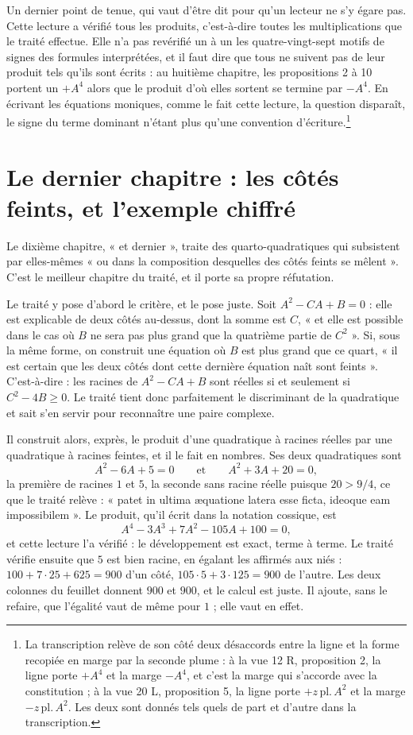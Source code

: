 \documentclass[11pt,a4paper]{article}
\begin{document}
Un dernier point de tenue, qui vaut d'être dit pour qu'un lecteur ne s'y égare
pas. Cette lecture a vérifié tous les produits, c'est-à-dire toutes les
multiplications que le traité effectue. Elle n'a pas revérifié un à un les
quatre-vingt-sept motifs de signes des formules interprétées, et il faut dire
que tous ne suivent pas de leur produit tels qu'ils sont écrits : au huitième
chapitre, les propositions 2 à 10 portent un $+A^4$ alors que le produit d'où
elles sortent se termine par $-A^4$. En écrivant les équations moniques, comme
le fait cette lecture, la question disparaît, le signe du terme dominant
n'étant plus qu'une convention d'écriture.\footnote{La transcription relève de
son côté deux désaccords entre la ligne et la forme recopiée en marge par la
seconde plume : à la vue 12 R, proposition 2, la ligne porte $+A^4$ et la marge
$-A^4$, et c'est la marge qui s'accorde avec la constitution ; à la vue 20 L,
proposition 5, la ligne porte $+z\,\mathrm{pl.}\,A^2$ et la marge
$-z\,\mathrm{pl.}\,A^2$. Les deux sont donnés tels quels de part et d'autre dans
la transcription.}

\section*{Le dernier chapitre : les côtés feints, et l'exemple chiffré}

Le dixième chapitre, « et dernier », traite des quarto-quadratiques qui
subsistent par elles-mêmes « ou dans la composition desquelles des côtés feints
se mêlent ». C'est le meilleur chapitre du traité, et il porte sa propre
réfutation.

Le traité y pose d'abord le critère, et le pose juste. Soit
$A^2 - CA + B = 0$ : elle est explicable de deux côtés au-dessus, dont la somme
est $C$, « et elle est possible dans le cas où $B$ ne sera pas plus grand que la
quatrième partie de $C^2$ ». Si, sous la même forme, on construit une équation
où $B$ est plus grand que ce quart, « il est certain que les deux côtés dont
cette dernière équation naît sont feints ». C'est-à-dire : les racines de
$A^2 - CA + B$ sont réelles si et seulement si $C^2 - 4B \ge 0$. Le traité tient
donc parfaitement le discriminant de la quadratique et sait s'en servir pour
reconnaître une paire complexe.

Il construit alors, exprès, le produit d'une quadratique à racines réelles par
une quadratique à racines feintes, et il le fait en nombres. Ses deux
quadratiques sont
\[ A^2 - 6A + 5 = 0 \qquad \text{et} \qquad A^2 + 3A + 20 = 0, \]
la première de racines $1$ et $5$, la seconde sans racine réelle puisque
$20 > 9/4$, ce que le traité relève : « patet in ultima æquatione latera esse
ficta, ideoque eam impossibilem ». Le produit, qu'il écrit dans la notation
cossique, est
\[ A^4 - 3A^3 + 7A^2 - 105A + 100 = 0, \]
et cette lecture l'a vérifié : le développement est exact, terme à terme. Le
traité vérifie ensuite que $5$ est bien racine, en égalant les affirmés aux
niés : $100 + 7\cdot 25 + 625 = 900$ d'un côté, $105 \cdot 5 + 3 \cdot 125 = 900$
de l'autre. Les deux colonnes du feuillet donnent $900$ et $900$, et le calcul
est juste. Il ajoute, sans le refaire, que l'égalité vaut de même pour $1$ ; elle
vaut en effet.
\end{document}
